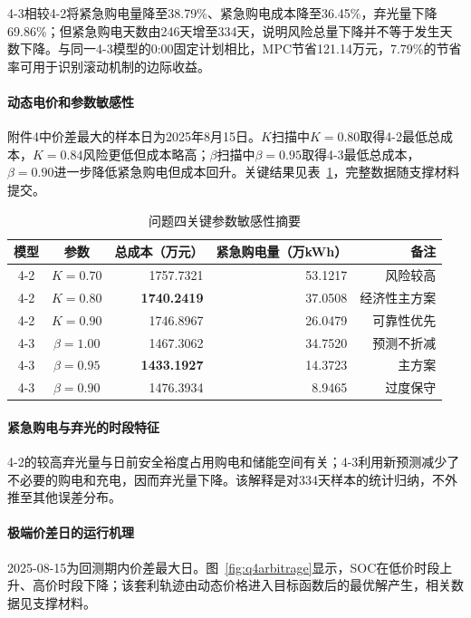 \documentclass{cumcmthesis}
\begin{document}
4-3相较4-2将紧急购电量降至38.79\%、紧急购电成本降至36.45\%，弃光量下降69.86\%；但紧急购电天数由246天增至334天，说明风险总量下降并不等于发生天数下降。与同一4-3模型的0:00固定计划相比，MPC节省121.14万元，7.79\%的节省率可用于识别滚动机制的边际收益。

\paragraph{动态电价和参数敏感性}

附件4中价差最大的样本日为2025年8月15日。$K$扫描中$K=0.80$取得4-2最低总成本，$K=0.84$风险更低但成本略高；$\beta$扫描中$\beta=0.95$取得4-3最低总成本，$\beta=0.90$进一步降低紧急购电但成本回升。关键结果见表~\ref{tab:q4sens}，完整数据随支撑材料提交。

\begin{table}[H]
\centering
\renewcommand\arraystretch{1.2}
\caption{问题四关键参数敏感性摘要}
\label{tab:q4sens}
\begin{tabular}{ccrrr}
\toprule
\textbf{模型} & \textbf{参数} & 总成本（万元） & 紧急购电量（万kWh） & 备注\\
\midrule
4-2 & $K=0.70$ & 1757.7321 & 53.1217 & 风险较高\\
4-2 & $K=0.80$ & \textbf{1740.2419} & 37.0508 & 经济性主方案\\
4-2 & $K=0.90$ & 1746.8967 & 26.0479 & 可靠性优先\\
4-3 & $\beta=1.00$ & 1467.3062 & 34.7520 & 预测不折减\\
4-3 & $\beta=0.95$ & \textbf{1433.1927} & 14.3723 & 主方案\\
4-3 & $\beta=0.90$ & 1476.3934 & 8.9465 & 过度保守\\
\bottomrule
\end{tabular}
\end{table}

\paragraph{紧急购电与弃光的时段特征}

4-2的较高弃光量与日前安全裕度占用购电和储能空间有关；4-3利用新预测减少了不必要的购电和充电，因而弃光量下降。该解释是对334天样本的统计归纳，不外推至其他误差分布。

\paragraph{极端价差日的运行机理}

2025-08-15为回测期内价差最大日。图~\ref{fig:q4arbitrage}显示，SOC在低价时段上升、高价时段下降；该套利轨迹由动态价格进入目标函数后的最优解产生，相关数据见支撑材料。
\end{document}
